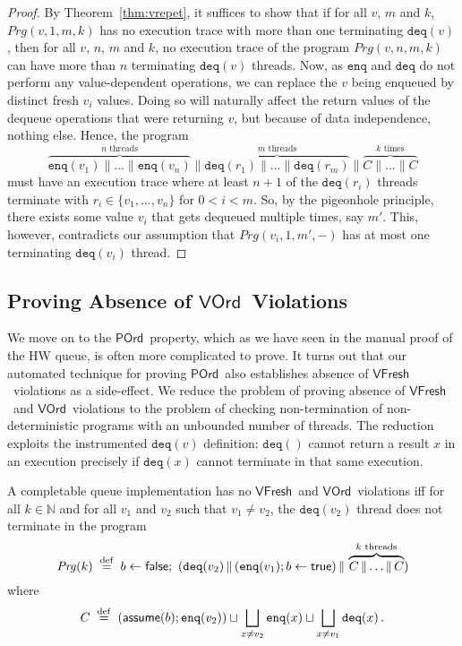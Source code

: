 \documentclass{LMCS}
\newcommand{\defeq}{\;\stackrel{\rm def}{=}\;}
\newcommand{\enq}{\ensuremath{\mathtt{enq}}}
\newcommand{\deq}{\ensuremath{\mathtt{deq}}}
\newcommand{\false}{\mathsf{false}}
\newcommand{\true}{\mathsf{true}}
\newcommand{\assume}{\mathsf{assume}}
\newcommand{\Prg}{\mathit{Prg}}
\newcommand{\ndchoice}{\sqcup}
\newcommand{\bigndchoice}{\bigsqcup}
\newcommand{\VFresh}{\ensuremath{\mathsf{VFresh}}}
\newcommand{\VOrd}{\ensuremath{\mathsf{VOrd}}}
\newcommand{\POrd}{\ensuremath{\mathsf{POrd}}}
\begin{document}
\begin{proof}
By Theorem~\ref{thm:vrepet}, it suffices to show that if
for all $v$, $m$ and $k$, $\Prg(v,1,m,k)$ has no execution trace with more than one
terminating $\deq(v)$, then
for all $v$, $n$, $m$ and $k$, no execution trace of the program $\Prg(v,n,m,k)$ can have more
than $n$ terminating $\deq(v)$ threads.
Now, as $\enq$ and $\deq$ do not perform any value-dependent operations, we can
replace the $v$ being enqueued by distinct fresh $v_i$ values.
Doing so will naturally affect the return values of the dequeue operations that
were returning $v$, but because of data independence, nothing else.
Hence, the program 
\[
   \overbrace{\enq(v_1) \parallel \ldots \parallel \enq(v_n)}^{n\text{ threads}} \parallel 
   \overbrace{\deq(r_1) \parallel \ldots \parallel \deq(r_m)}^{m\text{ threads}} \parallel 
   \overbrace{C \parallel \ldots \parallel C}^{k\text{ times}}
\]
must have an execution trace where at least $n+1$ of the $\deq(r_i)$ threads
terminate with $r_i \in \{ v_1, \ldots, v_n \}$ for $0 < i < m$.
So, by the pigeonhole principle, there exists some value $v_i$ that gets 
dequeued multiple times, say $m'$.  This, however, contradicts our assumption
that $\Prg(v_i,1,m',-)$ has at most one terminating $\deq(v_i)$ thread.
\end{proof}

\subsection*{Proving Absence of \VOrd\ Violations}

We move on to the \POrd\ property, which as we have seen in the manual proof of
the HW queue, is often more complicated to prove.  It turns out that our
automated technique for proving \POrd\ also establishes absence of \VFresh\
violations as a side-effect.
We reduce the problem of proving absence of \VFresh\ and \VOrd\ violations to the
problem of checking non-termination of non-deterministic programs with an
unbounded number of threads.  The reduction exploits the instrumented
$\deq(v)$ definition: $\deq()$ cannot return a result $x$ in an execution
precisely if $\deq(x)$ cannot terminate in that same execution. 

\begin{thm}\label{thm:vord}
A completable queue implementation has no \VFresh\ and \VOrd\ violations iff 
for all $k \in \mathbb{N}$ and for all $v_1$ and $v_2$ such that $v_1\neq v_2$, the $\deq(v_2)$
thread does not terminate in the program
\[
   \Prg(k) \defeq b\gets\false; ~ (\deq(v_2) \,\|\, (\enq(v_1); b\gets\true) \,\|\,
                          \overbrace{C \,\| \ldots \|\, C}^{\text{$k$ threads}} )
\]
where
\[
  C \defeq
  (\assume(b); \enq(v_2)) \ndchoice 
   \bigndchoice_{x\neq v_2} \enq(x) \ndchoice 
   \bigndchoice_{x\neq v_1} \deq(x)
\,.
\]
\end{thm}
\end{document}
